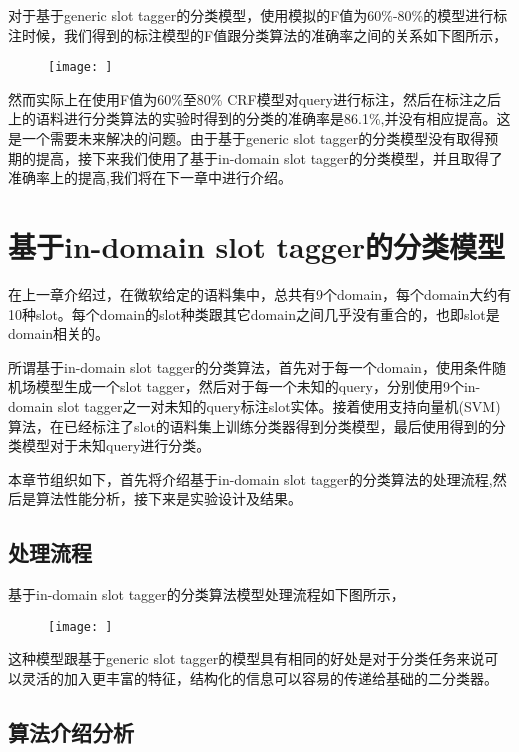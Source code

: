 \documentclass[master]{njuthesis}
\begin{document}
\begin{enumerate}
\begin{enumerate}
\begin{enumerate}
    对于基于generic slot tagger的分类模型，使用模拟的F值为60\%-80\%的模型进行标注时候，我们得到的标注模型的F值跟分类算法的准确率之间的关系如下图所示，

    \begin{figure}[htbp]
      \centering
      \texttt{[image: ]}
      \caption{}\label{fig:test1}
    \end{figure}
    
    然而实际上在使用F值为60\%至80\% CRF模型对query进行标注，然后在标注之后上的语料进行分类算法的实验时得到的分类的准确率是86.1\%,并没有相应提高。这是一个需要未来解决的问题。由于基于generic slot tagger的分类模型没有取得预期的提高，接下来我们使用了基于in-domain slot tagger的分类模型，并且取得了准确率上的提高,我们将在下一章中进行介绍。

\section{基于in-domain slot tagger的分类模型}

    在上一章介绍过，在微软给定的语料集中，总共有9个domain，每个domain大约有10种slot。每个domain的slot种类跟其它domain之间几乎没有重合的，也即slot是domain相关的。

    所谓基于in-domain slot tagger的分类算法，首先对于每一个domain，使用条件随机场模型生成一个slot tagger，然后对于每一个未知的query，分别使用9个in-domain slot tagger之一对未知的query标注slot实体。接着使用支持向量机(SVM)算法，在已经标注了slot的语料集上训练分类器得到分类模型，最后使用得到的分类模型对于未知query进行分类。
    
    本章节组织如下，首先将介绍基于in-domain slot tagger的分类算法的处理流程,然后是算法性能分析，接下来是实验设计及结果。

\subsection{处理流程}

    基于in-domain slot tagger的分类算法模型处理流程如下图所示，
    \begin{figure}[htbp]
      \centering
      \texttt{[image: ]}
      \caption{}\label{fig:test1}
    \end{figure}
    
    这种模型跟基于generic slot tagger的模型具有相同的好处是对于分类任务来说可以灵活的加入更丰富的特征，结构化的信息可以容易的传递给基础的二分类器。

\subsection{算法介绍分析}
    

\end{enumerate}
\end{enumerate}
\end{enumerate}
\end{document}
